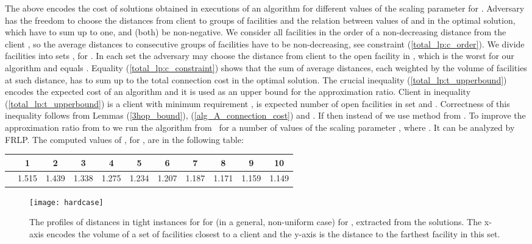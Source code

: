 \documentclass{llncs}
\begin{document}
The above  encodes the cost of solutions obtained in executions of an algorithm  for different values of the scaling parameter  for . Adversary has the freedom to choose the distances from client  to groups of facilities and the relation between values of  and  in the optimal solution, which have to sum up to one, and (both) be non-negative. We consider all facilities in the order of a non-decreasing distance from the client , so the average distances to consecutive groups of facilities have to be non-decreasing, see constraint (\ref{total_lp:c_order}). We divide facilities into sets , for . In each set  the adversary may choose the distance from client  to the open facility in , which is the worst for our algorithm and equals . Equality (\ref{total_lp:c_constraint}) shows that the sum of average distances, each weighted by the volume of facilities at such distance, has to sum up to the total connection cost in 
the optimal solution.  
The crucial inequality (\ref{total_lp:t_upperbound}) encodes the expected cost of an algorithm  and it is used as an upper bound for the approximation ratio. Client in inequality (\ref{total_lp:t_upperbound}) is a client with minimum requirement ,
 is expected number of open facilities in set  and . Correctness of this inequality follows from Lemmas (\ref{3hop_bound}), (\ref{alg_A_connection_cost}) and .
If  then instead of  we use method from \cite{Yan}. To improve the approximation ratio from  to  we run the algorithm from~\cite{Yan} for a number of values of the scaling parameter , where . It can be analyzed by FRLP. The computed values of , for , are in the following table:

\begin{center}
  \begin{tabular}{ c | c | c | c | c | c | c | c | c | c | c }
     & 1 & 2 & 3 & 4 & 5 & 6 & 7 & 8 & 9 & 10 \\ \hline
     & 1.515 & 1.439 & 1.338 & 1.275 & 1.234 & 1.207 & 1.187 & 1.171 & 1.159 & 1.149 \\
  \end{tabular}
\end{center}

\begin{figure}
  \centering
  \texttt{[image: hardcase]}
 \caption{The profiles of distances in tight instances for  for  (in a general, non-uniform case) for , extracted from the  solutions. The x-axis encodes the volume of a set of facilities closest to a client and the y-axis is the distance to the farthest facility in this set.}
  \label{fig:hardcase}
\end{figure}
\end{document}
